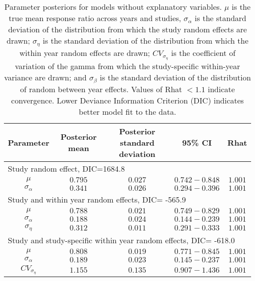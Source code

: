 \documentclass{article}\usepackage[]{graphicx}\usepackage[]{color}
\begin{document}
\begin{table}
  \renewcommand*\arraystretch{1.25}
  \centering
  \caption{Parameter posteriors for models without explanatory
    variables. $\mu$ is the true mean response ratio across years and
    studies, $\sigma_{\alpha}$ is the standard deviation of the
    distribution from which the study random effects are drawn;
    $\sigma_{\eta}$ is the standard deviation of the distribution from
    which the within year random effects are drawn; $CV_{\sigma_\eta}$ is the
    coefficient of variation of the gamma from which the
    study-specific within-year variance are drawn; and $\sigma_\beta$
    is the standard deviation of the distribution of random between year
    effects. Values of Rhat $< 1.1$ indicate convergence. Lower
    Deviance Information Criterion (DIC) indicates better model fit to
    the data.}

  \vspace{20pt}
  \label{table:params}
  \begin{tabular}{|c|c|c|c|c|} \hline
    Parameter & Posterior mean & Posterior standard deviation
    & 95\% CI & Rhat \\ \hline
    \multicolumn{5}{|l|}{Study random effect, DIC=1684.8} \\ \hline
    \multirow{1}{*}{$\mu$} &
    $0.795$ & $0.027$ & $0.742 - 0.848$ & $1.001$ \\ \hline
    \multirow{1}{*}{$\sigma_{\alpha}$} &
    $0.341$ & $0.026$ & $0.294 - 0.396$ & $1.001$ \\ \hline

    \multicolumn{5}{|l|}{Study and within year random effects,
      DIC= -565.9} \\ \hline
    \multirow{1}{*}{$\mu$} &
    $0.788$ & $0.021$ & $0.749 - 0.829$ & $1.001$ \\ \hline
    \multirow{1}{*}{$\sigma_{\alpha}$} &
    $0.188$ & $0.024$ & $0.144 - 0.239$ & $1.001$ \\ \hline
    \multirow{1}{*}{$\sigma_{\eta}$} &
    $0.312$ & $0.011$ & $0.291 - 0.333$ & $1.001$ \\ \hline

    \multicolumn{5}{|l|}{Study and study-specific within year random
      effects, DIC= -618.0} \\ \hline
    \multirow{1}{*}{$\mu$} &
    $0.808$ & $0.019$ & $0.771 - 0.845$ & $1.001$ \\ \hline
    \multirow{1}{*}{$\sigma_{\alpha}$} &
    $0.189$ & $0.023$ & $0.145 - 0.237$ & $1.001$ \\ \hline
   \multirow{1}{*}{$CV_{\sigma_\eta}$} &
    $1.155$ & $0.135$ & $0.907 - 1.436$ & $1.001$ \\ \hline


\end{tabular}
\end{table}
\end{document}
